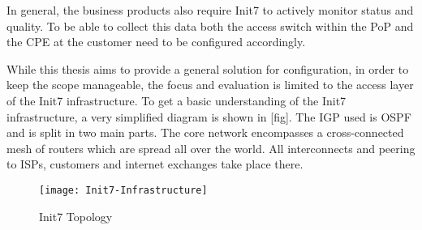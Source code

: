 In general, the business products also require Init7 to actively monitor status and quality. To be able to collect this data
both the access switch within the \acrfull{PoP} and the \acrshort{CPE} at the customer need to be configured accordingly.

While this thesis aims to provide a general solution for configuration, in order to keep the scope manageable, the focus
and evaluation is limited to the access layer of the Init7 infrastructure.
To get a basic understanding of the Init7 infrastructure, a very simplified diagram is shown in [fig]. The \acrfull{IGP} used is
\acrshort{OSPF} and is split in two main parts. The core network encompasses a cross-connected mesh of routers which are spread all
over the world. All interconnects and peering to ISPs, customers and internet exchanges take place there. 

\begin{figure}[h]
  \centering
  \texttt{[image: Init7-Infrastructure]}
  \caption{Init7 Topology}
  \label{fig:topology}
\end{figure}






